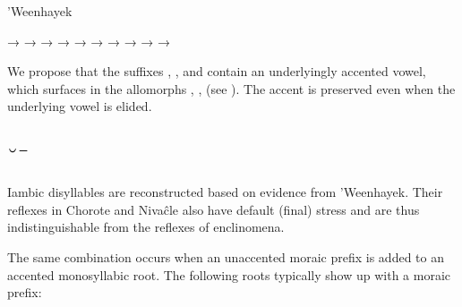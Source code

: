 \ea\label{ex:disspl:whk}
'Weenhayek \citep{KC16}
    \begin{xlist}
        \ex {} → 
        \ex {} → 
        \ex {} → 
        \ex {} → 
        \ex {} → 
        \ex {} → 
        \ex {} → 
        \ex {} → 
        \ex {} → 
        \ex {} → 
    \end{xlist}
\z
{}

We propose that the suffixes , , and  contain an underlyingly accented vowel, which surfaces in the allomorphs , ,  (see ). The accent is preserved even when the underlying vowel is elided.

\subsection{˘¯} \label{corta-larga}

Iambic disyllables are reconstructed based on evidence from ’Weenhayek. Their reflexes in Chorote and Nivaĉle also have default (final) stress and are thus indistinguishable from the reflexes of enclinomena.

\begin{exe}
    \ex \algarrobof
    \ex \coldweather
    \ex \dew
    \ex \watersg
    \ex \armadillo
    \ex \thorncutjansg
    \ex \savannahhawk
    \ex \jabiru
    \ex \deep
    \ex \longv
    \ex \chajasg
    \ex \duraznillo
    \ex \ashamedcw
\end{exe}

The same combination occurs when an unaccented moraic prefix is added to an accented monosyllabic root. The following roots typically show up with a moraic prefix:

\begin{exe}
    \ex \cutdown
    \ex \tell
    \ex \finger
    \ex \breath
    \ex \drinkv
    \ex \redv
    \ex \sendv
    \ex \answer
    \ex \chaguark
    \ex \stretchout
    \ex \hornclubpl
    \ex \killv
    \ex \feel
    \ex \offspring
    \ex \wash
    \ex \many
    \ex \roast
    \ex {}
    \ex \lightfire
    \ex \firewoodlhet
    \ex \yicalhukpl
    \ex \powder
    \ex \bathe
    \ex \bitter
    \ex \cook
    \ex \returnh
    \ex \foodpl
    \ex \costume
    \ex \tongue
    \ex \dovesipup
    \ex \throwcw
    \ex \tears
    \ex \hardvpr
    \ex \badmood
    \ex \burrow
    \ex \worm
    \ex \belly
    \ex \seev
    \ex \recipient
    \ex \burnvt
    \ex \pushv
\end{exe}

